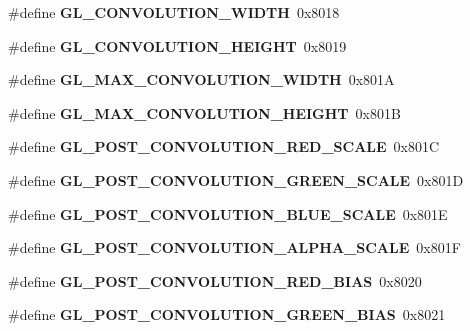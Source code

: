 \begin{DoxyCompactItemize}
\item 
\#define {\bfseries G\+L\+\_\+\+C\+O\+N\+V\+O\+L\+U\+T\+I\+O\+N\+\_\+\+W\+I\+D\+T\+H}~0x8018\label{_s_d_l__opengl_8h_aa5e1fe3544d20624c29fde754752e537}

\item 
\#define {\bfseries G\+L\+\_\+\+C\+O\+N\+V\+O\+L\+U\+T\+I\+O\+N\+\_\+\+H\+E\+I\+G\+H\+T}~0x8019\label{_s_d_l__opengl_8h_a3eff403f76d44094d4bb7c04156afe46}

\item 
\#define {\bfseries G\+L\+\_\+\+M\+A\+X\+\_\+\+C\+O\+N\+V\+O\+L\+U\+T\+I\+O\+N\+\_\+\+W\+I\+D\+T\+H}~0x801\+A\label{_s_d_l__opengl_8h_a3a8d919f43fc44308410859905737c2a}

\item 
\#define {\bfseries G\+L\+\_\+\+M\+A\+X\+\_\+\+C\+O\+N\+V\+O\+L\+U\+T\+I\+O\+N\+\_\+\+H\+E\+I\+G\+H\+T}~0x801\+B\label{_s_d_l__opengl_8h_a02c69b382a20810d5c3c8f036004cb8f}

\item 
\#define {\bfseries G\+L\+\_\+\+P\+O\+S\+T\+\_\+\+C\+O\+N\+V\+O\+L\+U\+T\+I\+O\+N\+\_\+\+R\+E\+D\+\_\+\+S\+C\+A\+L\+E}~0x801\+C\label{_s_d_l__opengl_8h_a7619915fb0608f760b086a983e6f1aee}

\item 
\#define {\bfseries G\+L\+\_\+\+P\+O\+S\+T\+\_\+\+C\+O\+N\+V\+O\+L\+U\+T\+I\+O\+N\+\_\+\+G\+R\+E\+E\+N\+\_\+\+S\+C\+A\+L\+E}~0x801\+D\label{_s_d_l__opengl_8h_a73d4a426cf831646db38f250cef87cc4}

\item 
\#define {\bfseries G\+L\+\_\+\+P\+O\+S\+T\+\_\+\+C\+O\+N\+V\+O\+L\+U\+T\+I\+O\+N\+\_\+\+B\+L\+U\+E\+\_\+\+S\+C\+A\+L\+E}~0x801\+E\label{_s_d_l__opengl_8h_ae48a6625f550f29d43691a2b95235e59}

\item 
\#define {\bfseries G\+L\+\_\+\+P\+O\+S\+T\+\_\+\+C\+O\+N\+V\+O\+L\+U\+T\+I\+O\+N\+\_\+\+A\+L\+P\+H\+A\+\_\+\+S\+C\+A\+L\+E}~0x801\+F\label{_s_d_l__opengl_8h_a0ec276b53dbfbba4912300766c98764d}

\item 
\#define {\bfseries G\+L\+\_\+\+P\+O\+S\+T\+\_\+\+C\+O\+N\+V\+O\+L\+U\+T\+I\+O\+N\+\_\+\+R\+E\+D\+\_\+\+B\+I\+A\+S}~0x8020\label{_s_d_l__opengl_8h_ad0d0540af972ced1abaa41c3aa50c352}

\item 
\#define {\bfseries G\+L\+\_\+\+P\+O\+S\+T\+\_\+\+C\+O\+N\+V\+O\+L\+U\+T\+I\+O\+N\+\_\+\+G\+R\+E\+E\+N\+\_\+\+B\+I\+A\+S}~0x8021\label{_s_d_l__opengl_8h_a0a42963578aad647b5b86d5b0e5f2778}


\end{DoxyCompactItemize}
